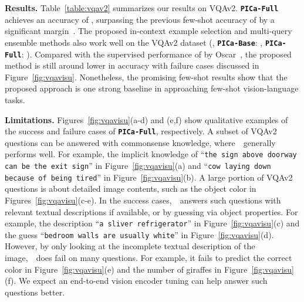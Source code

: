 \vspace{2mm}
\noindent\textbf{Results.}
Table~\ref{table:vqav2} summarizes our results on VQAv2. \textbf{\texttt{PICa-Full}} achieves an accuracy of , surpassing the previous few-shot accuracy of  by a significant margin~\cite{tsimpoukelli2021multimodal}. The proposed in-context example selection and multi-query ensemble methods also work well on the VQAv2 dataset (\cf, \textbf{\texttt{PICa-Base}}: , \textbf{\texttt{PICa-Full}}: ). Compared with the supervised performance of  by Oscar~\cite{li2020oscar}, the proposed method is still around  lower in accuracy with failure cases discussed in Figure~\ref{fig:vqavisu}. Nonetheless, the promising few-shot results show that the proposed approach is one strong baseline in approaching few-shot vision-language tasks.


\vspace{2mm}
\noindent\textbf{Limitations.}
Figures~\ref{fig:vqavisu}(a-d) and (e,f) show qualitative examples of the success and failure cases of \textbf{\texttt{PICa-Full}}, respectively. 
A subset of VQAv2 questions can be answered with commonsense knowledge, where~\oursmodel~generally performs well. For example, the implicit knowledge of ``\texttt{the sign above doorway can be the exit sign}'' in Figure~\ref{fig:vqavisu}(a) and ``\texttt{cow laying down because of being tired}'' in Figure~\ref{fig:vqavisu}(b). A large portion of VQAv2 questions is about detailed image contents, such as the object color in Figures~\ref{fig:vqavisu}(c-e). In the success cases,~\oursmodel~answers such questions with relevant textual descriptions if available, or by guessing via object properties. For example,  the description ``\texttt{a sliver refrigerator}'' in Figure~\ref{fig:vqavisu}(c) and the guess ``\texttt{bedroom walls are usually white}'' in Figure~\ref{fig:vqavisu}(d). However, by only looking at the incomplete textual description of the image,~\oursmodel~does fail on many questions. For example, it fails to predict the correct color in Figure~\ref{fig:vqavisu}(e) and the number of giraffes in Figure~\ref{fig:vqavisu}(f). We expect an end-to-end vision encoder tuning can help answer such questions better.